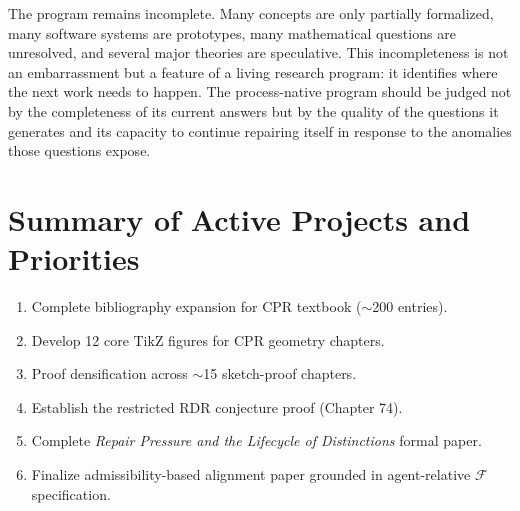 \documentclass[11pt, oneside]{book}
\theoremstyle{definition}
\theoremstyle{remark}
\begin{document}
The program remains incomplete. Many concepts are only partially formalized, many software systems are prototypes, many mathematical questions are unresolved, and several major theories are speculative. This incompleteness is not an embarrassment but a feature of a living research program: it identifies where the next work needs to happen. The process-native program should be judged not by the completeness of its current answers but by the quality of the questions it generates and its capacity to continue repairing itself in response to the anomalies those questions expose.


\backmatter

\chapter*{Summary of Active Projects and Priorities}

\begin{summarybox}
\begin{enumerate}[leftmargin=1.5em]
\item Complete bibliography expansion for CPR textbook ($\sim$200 entries).
\item Develop 12 core TikZ figures for CPR geometry chapters.
\item Proof densification across $\sim$15 sketch-proof chapters.
\item Establish the restricted RDR conjecture proof (Chapter 74).
\item Complete \textit{Repair Pressure and the Lifecycle of Distinctions} formal paper.
\item Finalize admissibility-based alignment paper grounded in agent-relative $\mathcal{F}$ specification.
\end{enumerate}
\end{summarybox}
\end{document}
